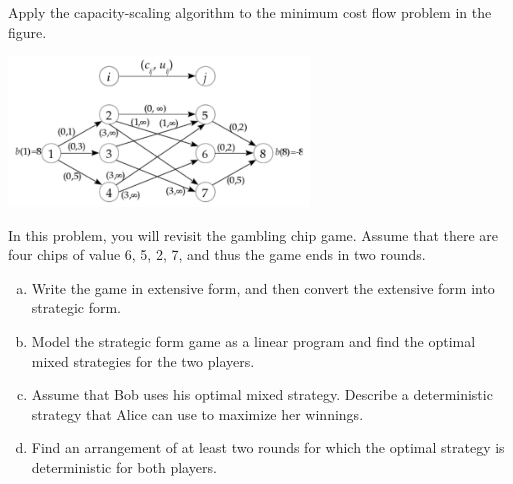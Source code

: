 \documentclass[fleqn]{homework}
\begin{document}
  \maketitle

  \begin{problem}{1}
    \begin{question}
      Apply the capacity-scaling algorithm to the minimum cost flow problem in
      the figure.

      \includegraphics[width=0.6\textwidth]{p1.png}
    \end{question}
  \end{problem}

  \begin{problem}{2}
    \begin{question}
      In this problem, you will revisit the gambling chip game.  Assume that
      there are four chips of value 6, 5, 2, 7, and thus the game ends in two
      rounds.

      \begin{enumerate}[a.]
      \item Write the game in extensive form, and then convert the extensive
        form into strategic form.
      \item Model the strategic form game as a linear program and find the
        optimal mixed strategies for the two players.
      \item Assume that Bob uses his optimal mixed strategy.  Describe a
        deterministic strategy that Alice can use to maximize her winnings.
      \item Find an arrangement of at least two rounds for which the optimal
        strategy is deterministic for both players.
      \end{enumerate}
    \end{question}
  \end{problem}
\end{document}
